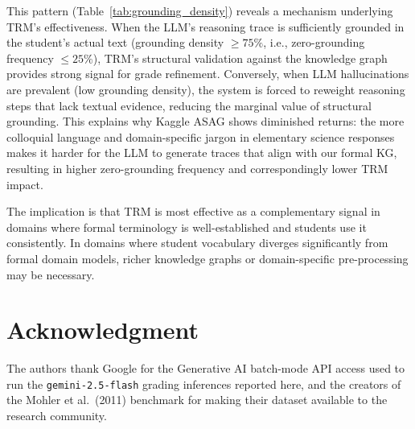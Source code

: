 \documentclass[conference]{IEEEtran}
\begin{document}
This pattern (Table~\ref{tab:grounding_density}) reveals a mechanism underlying TRM's
effectiveness. When the LLM's reasoning trace is sufficiently grounded in the
student's actual text (grounding density $\geq 75\%$, i.e., zero-grounding frequency
$\leq 25\%$), TRM's structural validation against the knowledge graph provides
strong signal for grade refinement. Conversely, when LLM hallucinations
are prevalent (low grounding density), the system is forced to reweight reasoning
steps that lack textual evidence, reducing the marginal value of structural
grounding. This explains why Kaggle ASAG shows diminished returns: the more
colloquial language and domain-specific jargon in elementary science responses
makes it harder for the LLM to generate traces that align with our formal KG,
resulting in higher zero-grounding frequency and correspondingly lower TRM impact.

The implication is that TRM is most effective as a complementary signal in domains
where formal terminology is well-established and students use it consistently. In
domains where student vocabulary diverges significantly from formal domain models,
richer knowledge graphs or domain-specific pre-processing may be necessary.

\section*{Acknowledgment}

The authors thank Google for the Generative AI batch-mode API access used
to run the \texttt{gemini-2.5-flash} grading inferences reported here, and
the creators of the Mohler et al.\ (2011) benchmark for making their
dataset available to the research community.
\end{document}

